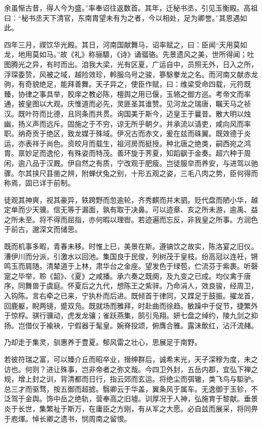 \documentclass[12pt,UTF8]{ctexbook}
\begin{document}
余虽惭古昔，得人今为盛。”率奉诏往返数首。其年，迁秘书丞，引见玉衡殿。高祖曰：“秘书丞天下清官，东南胄望未有为之者，今以相处，足为卿誉。”其恩遇如此。

四年三月，禊饮华光殿。其日，河南国献舞马，诏率赋之，曰：臣闻“天用莫如龙，地用莫如马。”故《礼》称骊騵，《诗》诵骝骆。先景遗风之美，世所得闻；吐图腾光之异，有时而出。洎我大梁，光有区夏，广运自中，员照无外，日入之所，浮琛委贽，风被之域，越险效珍，軨服乌号之骏，篸駼豢龙之名。而河南又献赤龙驹，有奇貌绝足，能拜善舞。天子异之，使臣作赋，曰：维梁受命四载，元符既臻，协律之事具举，胶庠之教必陈，檀舆之用已偃，玉辂之御方巡。考帝文而率通，披皇图以大观。庆惟道而必先，灵匪圣其谁赞。见河龙之瑞唐，瞩天马之祯汉。既叶符而比德，且同条而共贯。询国美于斯今，迈皇王于曩昔。散大明以烛幽，扬义声而远斥。固施之于不穷，谅无所乎朝夕。并承流以请吏，咸向风而率职。纳奇贡于绝区，致龙媒于殊域。伊况古而赤文，爰在兹而硃翼。既效德于炎运，亦表祥于尚色。资皎月而载生，祖河房而挺授。种北唐之绝类，嗣西宛之鸿胄。禀妙足而逸伦，有殊姿而特茂。善环旋于荠夏，知蹈飖于金奏。超六种于周闲，逾八品于汉厩。伊自然之有质，宁改观于肥瘦。岂徒服皁而养安，与进驾以驰骤。尔其挟尺县凿之辨，附蝉伏兔之别，十形五观之姿，三毛八肉之势，臣何得而称焉，固已详于前制。

徒观其神爽，视其豪异，轶跨野而忽逾轮，齐秀麒而并末驷。贬代盘而陋小华，越定单而少天骥。信无等于漏面，孰有取于决鼻。可以迹章、亥之所未游，逾禹、益之所未至。将不得而屈指，亦何暇以理辔。若迹遍而忘反，非我皇之所事。方润色于前古，邈深文而储思。

既而机事多暇，青春未移。时惟上巳，美景在斯。遵镐饮之故实，陈洛宴之旧仪。漕伊川而分派，引激水以回池。集国良于民俊，列树茂于皇枝。纷高冠以连衽，锵鸣玉而肩随。清辇道于上林，肃华台之金座。望发色于绿苞，伫流芬于紫裹。听磬寔之毕举，聆《韶》、《夏》之咸播。承六奏之既阕，及九变之已成。均仪禽于唐序，同舞兽于虞庭。怀夏后之九代，想陈王之紫骍。乃命涓人，效良骏，经周卫，入钩陈。言右牵之已来，宁执朴而后进。既倾首于律同，又蹀足于鼓振。擢龙首，回鹿躯，睨两镜，蹙双凫。既就场而雅拜，时赴曲而徐趋。敏躁中于促节，捷繁外于惊桴。骐行骥动，虎发龙骧；雀跃燕集，鹄引凫翔。妍七盘之绰约，陵九剑之抑扬。岂借仪于褕袂，宁假器于髦皇。婉脊投颂，俯膺合雅。露沫歕红，沾汗流赭。

乃却走于集灵，驯惠养于豊夏。郁风雷之壮心，思展足于南野。

若彼符瑞之富，可以臻介丘而昭卒业，搢绅群后，诚希末光，天子深穆为度，未之访也。何则？进让殊事，岂非帝者之弥文哉。今四卫外封，五岳内郡，宜弘下禅之规，增上封之训，背清都而日行，指云郊而玄运。将绝尘而弭辙，类飞鸟与駏驴。总三才而驱骛，按五御而超摅。翳卿云于华盖，翼条风于属车。无逸御于玉轸，不泛驾于金舆。饰中岳之绝轨，营奉高之旧墟。训厚况于人神，弘施育于黎献。垂景炎于长世，集繁祉于斯万，在庸臣之方刚，有从军之大愿。必自兹而展采，将同畀于庖煇。悼长卿之遗书，悯周南之留恨。
\end{document}
